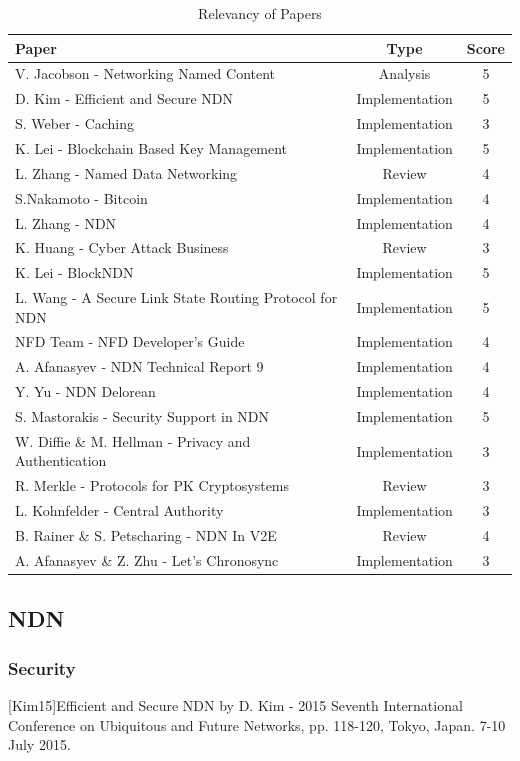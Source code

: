 \begin{table} [!htb]
\centering
\begin{tabular}{l|c|c}
Paper & Type & Score \\ \hline
V. Jacobson - Networking Named Content & Analysis & 5\\
D. Kim - Efficient and Secure NDN & Implementation & 5\\
S. Weber - Caching & Implementation & 3\\
K. Lei - Blockchain Based Key Management & Implementation & 5\\
L. Zhang - Named Data Networking & Review & 4\\
S.Nakamoto - Bitcoin & Implementation & 4 \\
L. Zhang - NDN & Implementation & 4 \\
K. Huang - Cyber Attack Business & Review & 3 \\  
K. Lei - BlockNDN & Implementation & 5 \\ 
L. Wang - A Secure Link State Routing Protocol for NDN & Implementation & 5 \\ 
NFD Team - NFD Developer's Guide & Implementation & 4 \\ 
A. Afanasyev - NDN Technical Report 9 & Implementation & 4 \\ 
Y. Yu - NDN Delorean & Implementation & 4\\
S. Mastorakis - Security Support in NDN & Implementation & 5\\
W. Diffie \& M. Hellman - Privacy and Authentication & Implementation & 3 \\
R. Merkle - Protocols for PK Cryptosystems & Review & 3 \\
L. Kohnfelder - Central Authority & Implementation & 3  \\
B. Rainer \& S. Petscharing - NDN In V2E&Review&4\\
A. Afanasyev \& Z. Zhu - Let's Chronosync & Implementation & 3 
\end{tabular}
\caption{Relevancy of Papers}

\end{table}
\subsection{NDN}
\subsubsection{Security}
[Kim15]Efficient and Secure NDN by D. Kim - 2015 Seventh International Conference on Ubiquitous and Future Networks, pp. 118-120, Tokyo, Japan. 7-10 July 2015.

